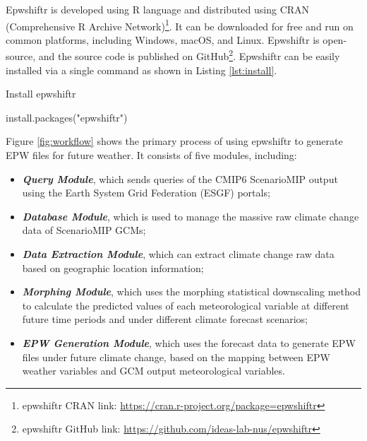 \documentclass[twocolumn, a4paper,10pt]{article}
\providecommand{\tightlist}{\setlength{\itemsep}{0pt}\setlength{\parskip}{0pt}}
\newenvironment{Code}{\captionsetup{type=code}}{}
\newenvironment{Shaded}{\begin{mdframed}[skipabove=0pt]}{\end{mdframed}}
\newcommand{\FunctionTok}[1]{\textcolor[rgb]{0.00,0.00,0.00}{#1}}
\newcommand{\NormalTok}[1]{#1}
\newcommand{\StringTok}[1]{\textcolor[rgb]{0.31,0.60,0.02}{#1}}
\begin{document}
Epwshiftr is developed using R \citep{RCoreTeam2019} language and distributed
using CRAN (Comprehensive R Archive Network)\footnote{epwshiftr CRAN link:
  \url{https://cran.r-project.org/package=epwshiftr}}. It can be downloaded for free
and run on common platforms, including Windows, macOS, and Linux. Epwshiftr is
open-source, and the source code is published on GitHub\footnote{epwshiftr GitHub link:
  \url{https://github.com/ideas-lab-nus/epwshiftr}}. Epwshiftr can be easily installed
via a single command as shown in Listing \ref{lst:install}.

\begin{Code}
\caption{Install epwshiftr}

\label{lst:install}

\begin{Shaded}
\begin{Highlighting}[]
\FunctionTok{install.packages}\NormalTok{(}\StringTok{"epwshiftr"}\NormalTok{)}
\end{Highlighting}
\end{Shaded}

\end{Code}

Figure \ref{fig:workflow} shows the primary process of using epwshiftr to
generate EPW files for future weather. It consists of five modules, including:

\begin{itemize}
\tightlist
\item
  \textbf{\emph{Query Module}}, which sends queries of the CMIP6 ScenarioMIP output using
  the Earth System Grid Federation (ESGF) portals;
\item
  \textbf{\emph{Database Module}}, which is used to manage the massive raw climate change data
  of ScenarioMIP GCMs;
\item
  \textbf{\emph{Data Extraction Module}}, which can extract climate change raw data based on
  geographic location information;
\item
  \textbf{\emph{Morphing Module}}, which uses the morphing statistical downscaling method to
  calculate the predicted values of each meteorological variable at different
  future time periods and under different climate forecast scenarios;
\item
  \textbf{\emph{EPW Generation Module}}, which uses the forecast data to generate EPW files
  under future climate change, based on the mapping between EPW weather
  variables and GCM output meteorological variables.
\end{itemize}
\end{document}
